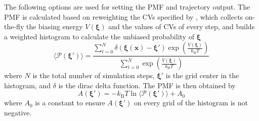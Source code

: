 The following options are used for setting the PMF and trajectory output. The PMF is calculated based on reweighting the CVs specified by , which collects on-the-fly the biasing energy $V(\boldsymbol{\xi})$ and the values of CVs of every step, and builds a weighted histogram to calculate the unbiased probability of $\boldsymbol{\xi}$
\begin{equation}
\langle \mathcal{P}\left(\boldsymbol{\xi}'\right) \rangle = \dfrac{\sum_{t=0}^N \delta\left(\boldsymbol{\xi}\left(\mathbf{x}\right)-\boldsymbol{\xi}'\right) \exp\left(\frac{V(\boldsymbol{\xi})}{k_{\mathrm{B}} T}\right)}{\sum_{t=0}^N \exp\left(\frac{V(\boldsymbol{\xi})}{k_{\mathrm{B}} T}\right)}
\end{equation}
where $N$ is the total number of simulation steps, $\boldsymbol{\xi}'$ is the grid center in the histogram, and $\delta$ is the dirac delta function. The PMF is then obtained by
\begin{equation}
A(\boldsymbol{\xi}')=-k_{\mathrm{B}} T \ln{\langle \mathcal{P}(\boldsymbol{\xi}') \rangle} + A_0
\end{equation}
where $A_0$ is a constant to ensure $A(\boldsymbol{\xi}')$ on every grid of the histogram is not negative.

